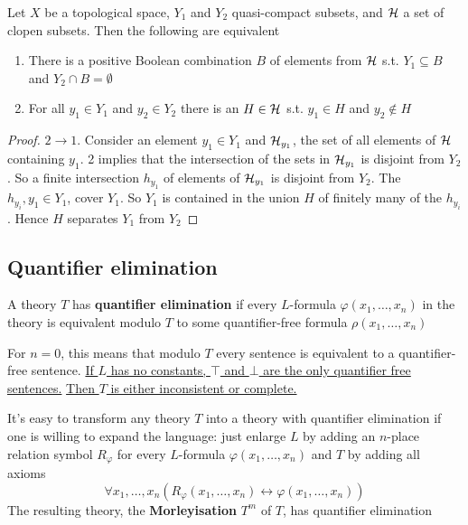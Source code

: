 \documentclass[11pt]{article}
\begin{document}
\begin{exercise}
\label{ex3.1.1}
Let \(X\) be a topological space, \(Y_1\) and \(Y_2\) quasi-compact subsets, and \(\mathcal{H}\) a set of
clopen subsets. Then the following are equivalent
\begin{enumerate}
\item There is a positive Boolean combination \(B\) of elements from \(\mathcal{H}\) s.t. \(Y_1\subseteq B\)
and \(Y_2\cap B=\emptyset\)
\item For all \(y_1\in Y_1\) and \(y_2\in Y_2\) there is an \(H\in\mathcal{H}\) s.t. \(y_1\in H\) and \(y_2\not\in H\)
\end{enumerate}
\end{exercise}

\begin{proof}
\(2\to 1\). Consider an element \(y_1\in Y_1\) and \(\mathcal{H}_{y_1}\), the set of all elements of \(\mathcal{H}\)
containing \(y_1\). 2 implies that the intersection of the sets in \(\mathcal{H}_{y_1}\) is disjoint
from \(Y_2\). So a finite intersection \(h_{y_1}\) of elements of \(\mathcal{H}_{y_1}\) is disjoint
from \(Y_2\). The \(h_{y_i},y_1\in Y_1\), cover \(Y_1\). So \(Y_1\) is contained in the union \(H\) of
finitely many of the \(h_{y_i}\). Hence \(H\) separates \(Y_1\) from \(Y_2\)
\end{proof}
\subsection{Quantifier elimination}
\label{sec:org20e117a}
\begin{definition}[]
A theory \(T\) has \textbf{quantifier elimination} if every \(L\)-formula
\(\varphi(x_1,\dots,x_n)\) in the theory is equivalent modulo \(T\) to some
quantifier-free formula \(\rho(x_1,\dots,x_n)\)
\end{definition}

For \(n=0\), this means that modulo \(T\) every sentence is equivalent to a quantifier-free
sentence. \uline{If \(L\) has no constants, \(\top\) and \(\bot\) are the only quantifier free sentences.}
\uline{Then \(T\) is either inconsistent or complete.}

It's easy to transform any theory \(T\) into a theory with quantifier
elimination if one is willing to expand the language: just enlarge \(L\) by
adding an \(n\)-place relation symbol \(R_{\varphi}\) for every \(L\)-formula
\(\varphi(x_1,\dots,x_n)\) and \(T\) by adding all axioms
\begin{equation*}
\forall x_1,\dots,x_n(R_\varphi(x_1,\dots,x_n)\leftrightarrow\varphi(x_1,\dots,x_n))
\end{equation*}
The resulting theory, the \textbf{Morleyisation} \(T^m\) of \(T\), has quantifier
elimination
\end{document}
